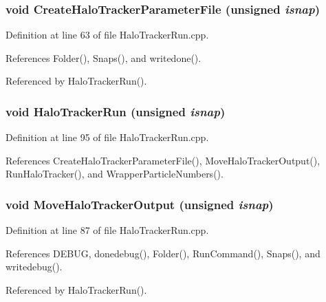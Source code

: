 \subsubsection[{CreateHaloTrackerParameterFile}]{\setlength{\rightskip}{0pt plus 5cm}void CreateHaloTrackerParameterFile (unsigned {\em isnap})}\label{HaloTrackerRun_8cpp_adb8e2d3e453485603ac1ddb77d669cd2}


Definition at line 63 of file HaloTrackerRun.cpp.



References Folder(), Snaps(), and writedone().



Referenced by HaloTrackerRun().

\subsubsection[{HaloTrackerRun}]{\setlength{\rightskip}{0pt plus 5cm}void HaloTrackerRun (unsigned {\em isnap})}\label{HaloTrackerRun_8cpp_a9cb4854254f44c5f21198856836ba77c}


Definition at line 95 of file HaloTrackerRun.cpp.



References CreateHaloTrackerParameterFile(), MoveHaloTrackerOutput(), RunHaloTracker(), and WrapperParticleNumbers().

\subsubsection[{MoveHaloTrackerOutput}]{\setlength{\rightskip}{0pt plus 5cm}void MoveHaloTrackerOutput (unsigned {\em isnap})}\label{HaloTrackerRun_8cpp_a645890dfd1a430544abd07a06a3b5224}


Definition at line 87 of file HaloTrackerRun.cpp.



References DEBUG, donedebug(), Folder(), RunCommand(), Snaps(), and writedebug().



Referenced by HaloTrackerRun().

